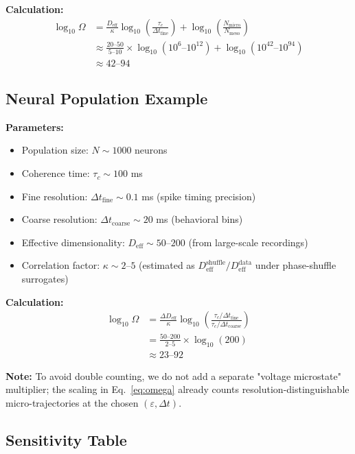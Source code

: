 \documentclass[12pt]{article}
\numberwithin{equation}{section}
\begin{document}
\textbf{Calculation:}
\begin{align}
\log_{10}\Omega &= \frac{D_{\text{eff}}}{\kappa} \log_{10}\left(\frac{\tau_c}{\Delta t_{\text{fine}}}\right) + \log_{10}\left(\frac{N_{\text{micro}}}{N_{\text{meso}}}\right) \\
&\approx \frac{20\text{--}50}{5\text{--}10} \times \log_{10}(10^{6}\text{--}10^{12}) + \log_{10}(10^{42}\text{--}10^{94}) \\
&\approx 42\text{--}94
\end{align}

\subsection{Neural Population Example}

\textbf{Parameters:}
\begin{itemize}
\item Population size: $N \sim 1000$ neurons
\item Coherence time: $\tau_c \sim 100$ ms
\item Fine resolution: $\Delta t_{\text{fine}} \sim 0.1$ ms (spike timing precision)
\item Coarse resolution: $\Delta t_{\text{coarse}} \sim 20$ ms (behavioral bins)
\item Effective dimensionality: $D_{\text{eff}} \sim 50$--$200$ (from large-scale recordings)
\item Correlation factor: $\kappa \sim 2$--$5$ (estimated as $D_{\text{eff}}^{\text{shuffle}}/D_{\text{eff}}^{\text{data}}$ under phase-shuffle surrogates)
\end{itemize}

\textbf{Calculation:}
\begin{align}
\log_{10}\Omega &= \frac{\Delta D_{\text{eff}}}{\kappa} \log_{10}\left(\frac{\tau_c/\Delta t_{\text{fine}}}{\tau_c/\Delta t_{\text{coarse}}}\right) \\
&= \frac{50\text{--}200}{2\text{--}5} \times \log_{10}(200) \\
&\approx 23\text{--}92
\end{align}

\textbf{Note:} To avoid double counting, we do not add a separate "voltage microstate" multiplier; the scaling in Eq.~\ref{eq:omega} already counts resolution-distinguishable micro-trajectories at the chosen $(\varepsilon,\Delta t)$.

\subsection{Sensitivity Table}
\end{document}
